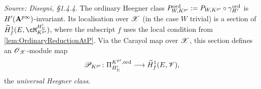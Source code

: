 \begin{definition}
  \label{def:UniversalHeegnerClass}
%
%
  \textit{Source: Disegni, §1.4.4.}
  The ordinary Heegner class $P^{\mathrm{ord}}_{W,K^{p\prime}} := P_{W,K^{p\prime}} \circ
  \gamma^{\mathrm{ord}}_{H'}$ is $H'(\mathbf{A}^{p\infty})$-invariant.  Its localisation
  over $\mathscr{X}$ (in the case $W$ trivial) is a section of
  $\tH^1_f(E, \cM_{K^{p\prime}}^{H'_\Sg})$, where the subscript $f$
  uses the local condition from \cref{lem:OrdinaryReductionAtP}.
  Via the Carayol map over $\mathscr{X}$, this section defines an
  $\mathscr{O}_{\mathscr{X}}$-module map
  \[
    \mathscr{P}_{K^{p\prime}} \colon
    \Pi^{K^{p\prime},\mathrm{ord}}_{H'_\Sigma}
    \longrightarrow \widetilde{H}^1_f(E, \mathscr{V}),
  \]
  the \emph{universal Heegner class}.
\end{definition}

